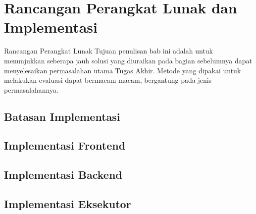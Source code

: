 \chapter{Rancangan Perangkat Lunak dan Implementasi}
Rancangan Perangkat Lunak
Tujuan penulisan bab ini adalah untuk menunjukkan seberapa jauh solusi yang diuraikan pada bagian sebelumnya dapat menyelesaikan permasalahan utama Tugas Akhir. Metode yang dipakai untuk melakukan evaluasi dapat bermacam-macam, bergantung pada jenis permasalahannya.

\section{Batasan Implementasi}
\blindtext

\section{Implementasi Frontend}
\blindtext

\section{Implementasi Backend}
\blindtext

\section{Implementasi Eksekutor}
\blindtext
